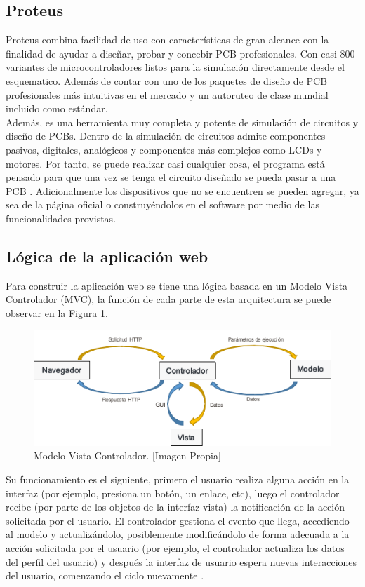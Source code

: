\subsection{Proteus}

Proteus combina facilidad de uso con características de gran alcance con la finalidad de ayudar a diseñar, probar y concebir PCB profesionales. Con casi 800 variantes de microcontroladores listos para la simulación directamente desde el esquematico. Además de contar con uno de los paquetes de diseño de PCB profesionales más intuitivas en el mercado y un autoruteo de clase mundial incluido como estándar. \cite{Prot1} \\

Además, es una herramienta muy completa y potente de simulación de circuitos y diseño de PCBs. Dentro de la simulación de circuitos admite componentes pasivos, digitales, analógicos y componentes más complejos como LCDs y motores. Por tanto, se puede realizar casi cualquier cosa, el programa está pensado para que una vez se tenga el circuito diseñado se pueda pasar a una PCB \cite{Prot2}. Adicionalmente los dispositivos que no se encuentren se pueden agregar, ya sea de la página oficial o construyéndolos en el software por medio de las funcionalidades provistas.

\subsection{Lógica de la aplicación web}

Para construir la aplicación web se tiene una lógica basada en un Modelo Vista Controlador (MVC), la función de cada parte de esta arquitectura se puede observar en la Figura \ref{fig:mvc}.\\

\begin{figure}[H]
	\centering
	\caption[Modelo-Vista-Controlador.]{Modelo-Vista-Controlador. [Imagen Propia]}
	\label{fig:mvc}
	\includegraphics[width=0.7\linewidth]{Imagenes/MVC}
\end{figure}

Su funcionamiento es el siguiente, primero el usuario realiza alguna acción en la interfaz (por ejemplo, presiona un botón, un enlace, etc), luego el controlador recibe (por parte de los objetos de la interfaz-vista) la notificación de la acción solicitada por el usuario. El controlador gestiona el evento que llega, accediendo al modelo y actualizándolo, posiblemente modificándolo de forma adecuada a la acción solicitada por el usuario (por ejemplo, el controlador actualiza los datos del perfil del usuario) y después la interfaz de usuario espera nuevas interacciones del usuario, comenzando el ciclo nuevamente \cite{MVC2}.\\

